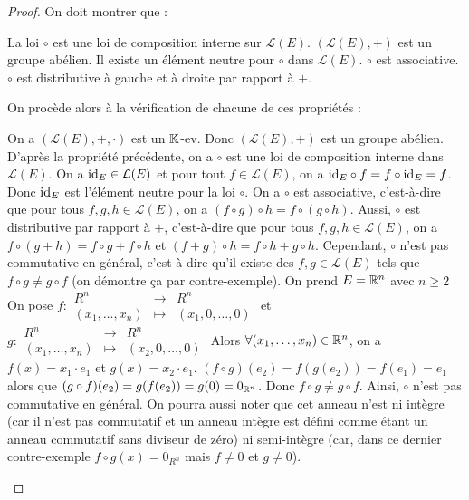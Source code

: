 \documentclass[12pt, a4paper]{report}
\begin{document}
\begin{proof}
    On doit montrer que :
    \begin{outline}
        \1 La loi $\circ$ est une loi de composition interne sur $\mathcal L(E)$.
        \1 $(\mathcal L(E), +)$ est un groupe abélien.
        \1 Il existe un élément neutre pour $\circ$ dans $\mathcal L(E)$.
        \1 $\circ$ est associative.
        \1 $\circ$ est distributive à gauche et à droite par rapport à $+$.
    \end{outline}
    On procède alors à la vérification de chacune de ces propriétés :
    \begin{outline}
        \1 On a $(\mathcal L(E), +, \cdot)$ est un $\mathbb{K}$-ev. Donc $(\mathcal L(E), +)$ est un groupe abélien.
        \1 D'après la propriété précédente, on a $\circ$ est une loi de composition interne dans $\mathcal L(E)$.
        \1 On a $\mathrm{id}_E \in \mathcal L(E)$ et pour tout $f \in \mathcal L(E)$, on a $\mathrm{id}_E \circ f = f \circ \mathrm{id}_E = f$. Donc $\mathrm{id}_E$ est l'élément neutre pour la loi $\circ$.
        \1 On a $\circ$ est associative, c'est-à-dire que pour tous $f,g,h \in \mathcal L(E)$, on a $(f \circ g) \circ h = f \circ (g \circ h)$.
        \1 Aussi, $\circ$ est distributive par rapport à $+$, c'est-à-dire que pour tous $f,g,h \in \mathcal L(E)$, on a $f \circ (g + h) = f \circ g + f \circ h$ et $(f + g) \circ h = f \circ h + g \circ h$.
        \1 Cependant, $\circ$ n'est pas commutative en général, c'est-à-dire qu'il existe des $f,g \in \mathcal L(E)$ tels que $f \circ g \neq g \circ f$ (on démontre ça par contre-exemple).
            \2 On prend $E = \mathbb{R}^n$ avec $n \ge 2$
            \2 On pose $f : \begin{matrix}
            R^n &\to &R^n\\
            (x_1,\dots,x_n) &\mapsto &(x_1,0,\dots,0)
            \end{matrix}$ et $g : \begin{matrix}
            R^n &\to &R^n\\
            (x_1,\dots,x_n) &\mapsto &(x_2,0,\dots,0)
            \end{matrix}$
            \2 Alors $\forall (x_1,\dots,x_n) \in \mathbb{R}^n$, on a $f(x) = x_1\cdot e_1$ et $g(x) = x_2\cdot e_1$.
            \2 $(f \circ g)(e_2) = f(g(e_2)) = f(e_1) = e_1$ alors que $(g \circ f)(e_2) = g(f(e_2)) = g(0) = 0_{\mathbb{R}^n}$. Donc $f \circ g \neq g \circ f$.
            \2 Ainsi, $\circ$ n'est pas commutative en général.
            \3 On pourra aussi noter que cet anneau n'est ni intègre (car il n'est pas commutatif et un anneau intègre est défini comme étant un anneau commutatif sans diviseur de zéro) ni semi-intègre (car, dans ce dernier contre-exemple $f\circ g(x) = 0_{R^n}$ mais $f \neq 0$ et $g \neq 0$).
    \end{outline}
\end{proof}
\end{document}
